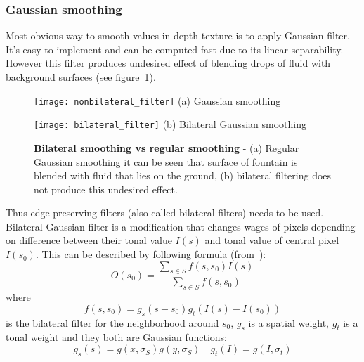 \subsubsection{Gaussian smoothing} \label{sec:gaussiansmoothing}
Most obvious way to smooth values in depth texture is to apply Gaussian filter. It's easy to implement and can be computed fast due to its linear separability. However this filter produces undesired effect of blending drops of fluid with background surfaces (see figure~\ref{gaussian_filter_img}). 
\begin{figure}[ht]
\begin{minipage}[b]{0.5\linewidth}
\centering
\texttt{[image: nonbilateral\_filter]}
(a) Gaussian smoothing
\end{minipage}
\hspace{0.2cm}
\begin{minipage}[b]{0.5\linewidth}
\centering
\texttt{[image: bilateral\_filter]}
(b) Bilateral Gaussian smoothing
\end{minipage}
\caption{\textbf{Bilateral smoothing vs regular smoothing} - (a) Regular Gaussian smoothing it can be seen that surface of fountain is blended with fluid that lies on the ground, (b) bilateral filtering does not produce this undesired effect. }
\label{gaussian_filter_img}
\end{figure}
Thus edge-preserving filters (also called bilateral filters) needs to be used. Bilateral Gaussian filter is a modification that changes wages of pixels depending on difference between their tonal value $I(s)$ and tonal value of central pixel $I(s_0)$. This can be described by following formula (from~\cite{PhamVliet2005}): 
\begin{equation}
\label{bilateral_equation}
O(s_0) = \frac{\sum_{s \in S}f(s, s_0)I(s)}{\sum_{s \in S}f(s, s_0)}
\end{equation}
where 
\begin{equation}
\label{bilateral_weights_equation}
f(s, s_0) = g_s(s-s_0)g_t(I(s)-I(s_0))
\end{equation}
is the bilateral filter for the neighborhood around $s_0$, $g_s$ is a spatial weight, $g_t$ is a tonal weight and they both are Gaussian functions:
\begin{equation}
\label{bilateral_dist_equation}
g_s(s) = g(x, \sigma_S)g(y, \sigma_S)  \quad   g_t(I) = g(I, \sigma_t)
\end{equation}

